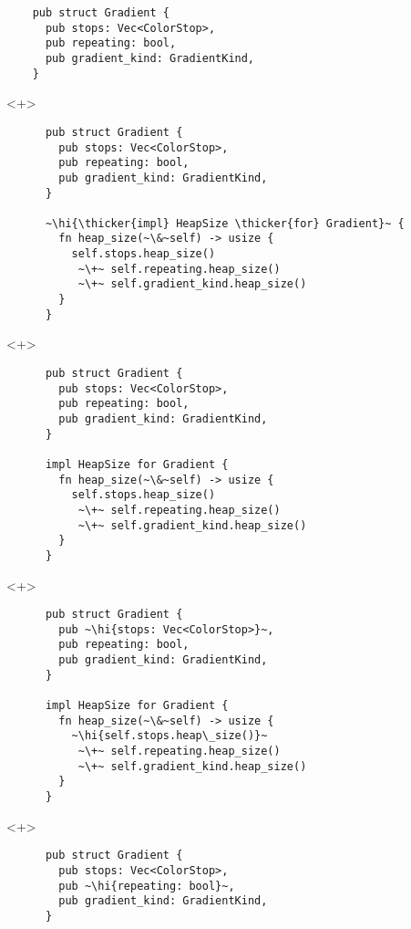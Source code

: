 \documentclass[usepdftitle=false]{beamer}
\renewcommand{\&}{\makebox[\widthof{\ampersand}][c]{\scalebox{0.9}[1.0]{\Book\ampersand}}}
\newcommand{\+}{\makebox[\widthof{+}][c]{\raisebox{-.2\height}{\scalefont{1.5}\Light+}}}
\newcommand{\thicker}[1]{\contourlength{0.26pt}\contour[10]{black}{#1}}
\newcommand{\hi}[1]{%
\tikz[baseline=(A.base)]
 \node[highlighting=0,inner sep=0pt,text depth=0pt] (A) {#1};%
}
\begin{document}
\begin{frame}[fragile]
  \begin{verbatim}
    pub struct Gradient {
      pub stops: Vec<ColorStop>,
      pub repeating: bool,
      pub gradient_kind: GradientKind,
    }
  \end{verbatim}
\end{frame}

\begin{frame}[fragile]
  \begin{onlyenv}<+>
    \begin{verbatim}
      pub struct Gradient {
        pub stops: Vec<ColorStop>,
        pub repeating: bool,
        pub gradient_kind: GradientKind,
      }

      ~\hi{\thicker{impl} HeapSize \thicker{for} Gradient}~ {
        fn heap_size(~\&~self) -> usize {
          self.stops.heap_size()
           ~\+~ self.repeating.heap_size()
           ~\+~ self.gradient_kind.heap_size()
        }
      }
    \end{verbatim}
  \end{onlyenv}
  \begin{onlyenv}<+>
    \begin{verbatim}
      pub struct Gradient {
        pub stops: Vec<ColorStop>,
        pub repeating: bool,
        pub gradient_kind: GradientKind,
      }

      impl HeapSize for Gradient {
        fn heap_size(~\&~self) -> usize {
          self.stops.heap_size()
           ~\+~ self.repeating.heap_size()
           ~\+~ self.gradient_kind.heap_size()
        }
      }
    \end{verbatim}
  \end{onlyenv}
  \begin{onlyenv}<+>
    \begin{verbatim}
      pub struct Gradient {
        pub ~\hi{stops: Vec<ColorStop>}~,
        pub repeating: bool,
        pub gradient_kind: GradientKind,
      }

      impl HeapSize for Gradient {
        fn heap_size(~\&~self) -> usize {
          ~\hi{self.stops.heap\_size()}~
           ~\+~ self.repeating.heap_size()
           ~\+~ self.gradient_kind.heap_size()
        }
      }
    \end{verbatim}
  \end{onlyenv}
  \begin{onlyenv}<+>
    \begin{verbatim}
      pub struct Gradient {
        pub stops: Vec<ColorStop>,
        pub ~\hi{repeating: bool}~,
        pub gradient_kind: GradientKind,
      }


\end{verbatim}
\end{onlyenv}
\end{frame}
\end{document}
